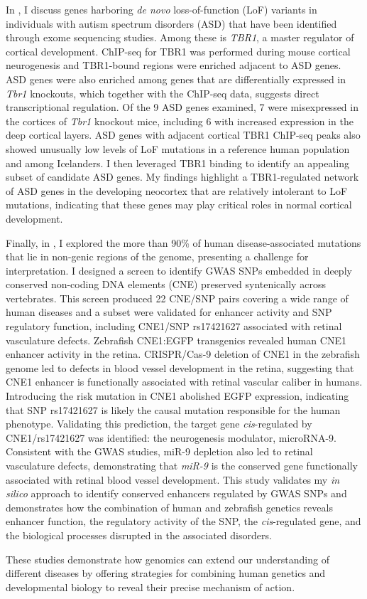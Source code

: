 In , I discuss genes harboring \emph{de novo} loss-of-function (LoF) variants in individuals with autism spectrum disorders (ASD) that have been identified through exome sequencing studies. Among these is \emph{TBR1}, a master regulator of cortical development. ChIP-seq for TBR1 was performed during mouse cortical neurogenesis and TBR1-bound regions were enriched adjacent to ASD genes. ASD genes were also enriched among genes that are differentially expressed in \emph{Tbr1} knockouts, which together with the ChIP-seq data, suggests direct transcriptional regulation. Of the 9 ASD genes examined, 7 were misexpressed in the cortices of \emph{Tbr1} knockout mice, including 6 with increased expression in the deep cortical layers. ASD genes with adjacent cortical TBR1 ChIP-seq peaks also showed unusually low levels of LoF mutations in a reference human population and among Icelanders. I then leveraged TBR1 binding to identify an appealing subset of candidate ASD genes. My findings highlight a TBR1-regulated network of ASD genes in the developing neocortex that are relatively intolerant to LoF mutations, indicating that these genes may play critical roles in normal cortical development.
%

Finally, in , I explored the more than 90\% of human disease-associated mutations that lie in non-genic regions of the genome, presenting a challenge for interpretation. I designed a screen to identify GWAS SNPs embedded in deeply conserved non-coding DNA elements (CNE) preserved syntenically across vertebrates. This screen produced 22 CNE/SNP pairs covering a wide range of human diseases and a subset  were validated for enhancer activity and SNP regulatory function, including CNE1/SNP rs17421627 associated with retinal vasculature defects. Zebrafish CNE1:EGFP transgenics revealed human CNE1 enhancer activity in the retina. CRISPR/Cas-9 deletion of CNE1 in the zebrafish genome led to defects in blood vessel development in the retina, suggesting that CNE1 enhancer is functionally associated with retinal vascular caliber in humans. Introducing the risk mutation in CNE1 abolished EGFP expression, indicating that SNP rs17421627 is likely the causal mutation responsible for the human phenotype. Validating this prediction, the target gene \emph{cis}-regulated by CNE1/rs17421627 was identified: the neurogenesis modulator, microRNA-9. Consistent with the GWAS studies, miR-9 depletion also led to retinal vasculature defects, demonstrating that \emph{miR-9} is the conserved gene functionally associated with retinal blood vessel development. This study validates my \emph{in silico} approach to identify conserved enhancers regulated by GWAS SNPs and demonstrates how the combination of human and zebrafish genetics reveals enhancer function, the regulatory activity of the SNP, the \emph{cis}-regulated gene, and the biological processes disrupted in the associated disorders.
%

These studies demonstrate how genomics can extend our understanding of different diseases by offering strategies for combining human genetics and developmental biology to reveal their precise mechanism of action.

